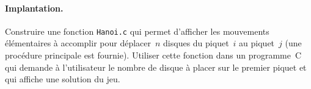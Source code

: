 \begin{exercice}
\paragraph{Implantation.}
Construire une  fonction  {\tt  Hanoi.c}   qui permet  d'afficher  les
mouvements  \'el\'ementaires \`a accomplir pour d\'eplacer~$n$ disques
du piquet~$i$ au piquet~$j$  (une proc\'edure principale est fournie). 
Utiliser  cette fonction   dans    un  programme~C qui  demande    \`a
l'utilisateur le nombre de disque \`a placer sur le premier piquet et
qui affiche une solution du jeu.%
\ifcorrection
\begin{correction}

\end{correction}
\fi
\end{exercice}
